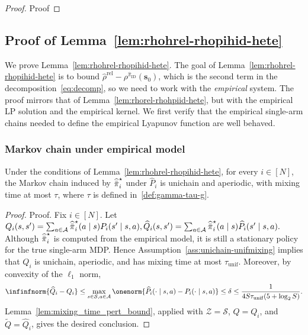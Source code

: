\documentclass[mnsc,nonblindrev]{informs3}
\newcommand{\Phat}{\widehat{P}}
\newcommand{\pihid}{\widehat{\pi}_{\mathrm{ID}}}
\newcommand{\pihbst}{\widehat{\Bar{\pi}}^\star}
\newcommand{\tmix}{\tau_{\mathrm{unif}}}
\newcommand{\bms}{\bm{s}}
\newcommand{\rhohrel}{\widehat{\rho}^{\mathrm{rel}}}
\newcommand{\States}{\mathcal{S}}
\newcommand{\Actions}{\mathcal{A}}
\begin{document}
\begin{APPENDICES}
\begin{proof}{Proof}
\end{proof}


\subsection{Proof of Lemma~\ref{lem:rhohrel-rhopihid-hete}}\label{subsec:pr-C2-hete}
We prove Lemma~\ref{lem:rhohrel-rhopihid-hete}. The goal of Lemma~\ref{lem:rhohrel-rhopihid-hete} is to bound $\rhohrel-\rho^{\pihid}(\bms_0)$, which is the second term in the decomposition~\eqref{eq:decomp}, so we need to work with the \emph{empirical} system. The proof mirrors that of
Lemma~\ref{lem:rhorel-rhohpiid-hete}, but with the empirical LP solution
and the empirical kernel. We first verify that the empirical single-arm
chains needed to define the empirical Lyapunov function are well behaved.

\subsubsection{Markov chain under empirical model}
\label{subsec:MCs-pihbst}

\begin{lemma}
\label{lem:unichain}
\label{lem:empirical-single-arm-chain}
Under the conditions of Lemma~\ref{lem:rhohrel-rhopihid-hete}, for every \(i\in[N]\), the Markov
chain induced by \(\pihbst_i\) under \(\Phat_i\) is unichain and aperiodic,
with mixing time at most \(\tau\), where $\tau$ is defined in~\eqref{def:gamma-tau-g}. 
\end{lemma}

\begin{proof}{Proof.}
Fix \(i\in[N]\). Let
\(
    Q_i(s,s')
    =
    \sum_{a\in\Actions}\pihbst_i(a\mid s)P_i(s'\mid s,a),
    \widehat Q_i(s,s')
    =
    \sum_{a\in\Actions}\pihbst_i(a\mid s)\Phat_i(s'\mid s,a).
\)
Although \(\pihbst_i\) is computed from the empirical model, it is still a
stationary policy for the true single-arm MDP. Hence
Assumption~\ref{ass:unichain-unifmixing} implies that \(Q_i\) is unichain,
aperiodic, and has mixing time at most \(\tmix\). Moreover, by convexity of
the \(\ell_1\) norm,
\[
    \infinfnorm{\widehat Q_i-Q_i}
    \le
    \max_{s\in\States,a\in\Actions}
    \onenorm{\Phat_i(\cdot\mid s,a)-P_i(\cdot\mid s,a)}
    \le
    \delta\le
    \frac{1}{4S\tmix(5+\log_2 S)} .
\]
Lemma~\ref{lem:mixing_time_pert_bound}, applied with
\(\mathcal Z=\States\), \(Q=Q_i\), and
\(\widetilde Q=\widehat Q_i\), gives the desired conclusion.
\end{proof}


\end{APPENDICES}
\end{document}
